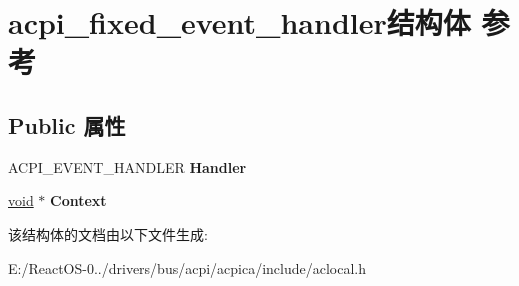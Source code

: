 \hypertarget{structacpi__fixed__event__handler}{}\section{acpi\+\_\+fixed\+\_\+event\+\_\+handler结构体 参考}
\label{structacpi__fixed__event__handler}
\subsection*{Public 属性}
\begin{DoxyCompactItemize}
\item 
\mbox{\label{structacpi__fixed__event__handler_a58fe4cc0c2eb5cca5e974ab5f6b108a3}} 
A\+C\+P\+I\+\_\+\+E\+V\+E\+N\+T\+\_\+\+H\+A\+N\+D\+L\+ER {\bfseries Handler}
\item 
\mbox{\label{structacpi__fixed__event__handler_ac8ff6422178d9be9c64713ad6a2a29c1}} 
\hyperlink{interfacevoid}{void} $\ast$ {\bfseries Context}
\end{DoxyCompactItemize}


该结构体的文档由以下文件生成\+:\begin{DoxyCompactItemize}
\item 
E\+:/\+React\+O\+S-\/0../drivers/bus/acpi/acpica/include/aclocal.\+h\end{DoxyCompactItemize}
